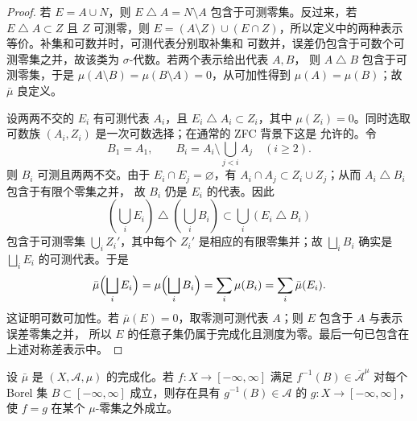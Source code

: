 \begin{proof}
若 $E=A\cup N$，则 $E\mathbin\triangle A=N\setminus A$ 包含于可测零集。反过来，若
$E\mathbin\triangle A\subset Z$ 且 $Z$ 可测零，则
$E=(A\setminus Z)\cup(E\cap Z)$，所以定义中的两种表示等价。补集和可数并时，可测代表分别取补集和
可数并，误差仍包含于可数个可测零集之并，故该类为 $\sigma$-代数。若两个表示给出代表 $A,B$，
则 $A\mathbin\triangle B$ 包含于可测零集，于是
$\mu(A\setminus B)=\mu(B\setminus A)=0$，从可加性得到 $\mu(A)=\mu(B)$；故 $\bar\mu$ 良定义。

设两两不交的 $E_i$ 有可测代表 $A_i$，且 $E_i\mathbin\triangle A_i\subset Z_i$，其中
$\mu(Z_i)=0$。同时选取可数族 $(A_i,Z_i)$ 是一次可数选择；在通常的 \textsf{ZFC} 背景下这是
允许的。令
\[
 B_1=A_1,\qquad B_i=A_i\setminus\bigcup_{j<i}A_j\quad(i\ge2).
\]
则 $B_i$ 可测且两两不交。由于 $E_i\cap E_j=\varnothing$，有
$A_i\cap A_j\subset Z_i\cup Z_j$；从而 $A_i\mathbin\triangle B_i$ 包含于有限个零集之并，
故 $B_i$ 仍是 $E_i$ 的代表。因此
\[
 \left(\bigcup_iE_i\right)\mathbin\triangle
 \left(\bigcup_iB_i\right)
 \subset\bigcup_i(E_i\mathbin\triangle B_i)
\]
包含于可测零集 $\bigcup_iZ_i'$，其中每个 $Z_i'$ 是相应的有限零集并；故
$\bigsqcup_iB_i$ 确实是 $\bigsqcup_iE_i$ 的可测代表。于是
\[
 \bar\mu\Bigl(\bigsqcup_iE_i\Bigr)
 =\mu\Bigl(\bigsqcup_iB_i\Bigr)
 =\sum_i\mu(B_i)=\sum_i\bar\mu(E_i).
\]
这证明可数可加性。若 $\bar\mu(E)=0$，取零测可测代表 $A$；则 $E$ 包含于 $A$ 与表示误差零集之并，
所以 $E$ 的任意子集仍属于完成化且测度为零。最后一句已包含在上述对称差表示中。
\end{proof}

\begin{proposition}[完成化可测函数的代表]\label{prop:completion-measurable-function-representative}
设 $\bar\mu$ 是 $(X,\mathcal A,\mu)$ 的完成化。若
$f:X\to[-\infty,\infty]$ 满足
$f^{-1}(B)\in\overline{\mathcal A}^{\mu}$ 对每个 Borel 集
$B\subset[-\infty,\infty]$ 成立，则存在具有
$g^{-1}(B)\in\mathcal A$ 的 $g:X\to[-\infty,\infty]$，使 $f=g$ 在某个 $\mu$-零集之外成立。
\end{proposition}

